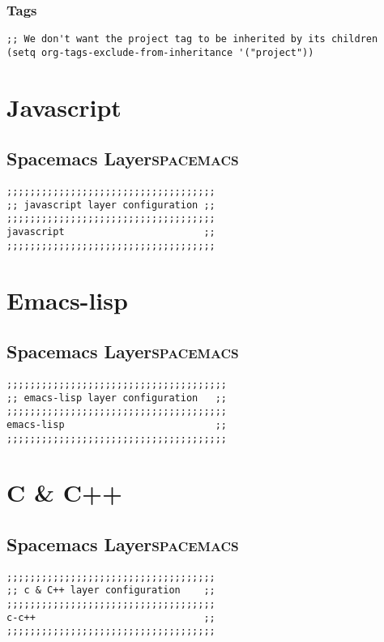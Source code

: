 \documentclass[11pt]{article}
\begin{document}
\subsubsection{Tags}
\label{sec:org92c714c}
\begin{verbatim}
;; We don't want the project tag to be inherited by its children
(setq org-tags-exclude-from-inheritance '("project"))
\end{verbatim}



\section{Javascript}
\label{sec:org60f302c}
\subsection{Spacemacs Layer\hfill{}\textsc{spacemacs}}
\label{sec:org8e4829a}
\begin{verbatim}
;;;;;;;;;;;;;;;;;;;;;;;;;;;;;;;;;;;;
;; javascript layer configuration ;;
;;;;;;;;;;;;;;;;;;;;;;;;;;;;;;;;;;;;
javascript                        ;;
;;;;;;;;;;;;;;;;;;;;;;;;;;;;;;;;;;;;
\end{verbatim}

\section{Emacs-lisp}
\label{sec:orgd91cd55}
\subsection{Spacemacs Layer\hfill{}\textsc{spacemacs}}
\label{sec:org3e1f2b0}
\begin{verbatim}
;;;;;;;;;;;;;;;;;;;;;;;;;;;;;;;;;;;;;;
;; emacs-lisp layer configuration   ;;
;;;;;;;;;;;;;;;;;;;;;;;;;;;;;;;;;;;;;;
emacs-lisp                          ;;
;;;;;;;;;;;;;;;;;;;;;;;;;;;;;;;;;;;;;;
\end{verbatim}

\section{C \& C++}
\label{sec:org8bfdc8e}
\subsection{Spacemacs Layer\hfill{}\textsc{spacemacs}}
\label{sec:org8832311}
\begin{verbatim}
;;;;;;;;;;;;;;;;;;;;;;;;;;;;;;;;;;;;
;; c & C++ layer configuration    ;;
;;;;;;;;;;;;;;;;;;;;;;;;;;;;;;;;;;;;
c-c++                             ;;
;;;;;;;;;;;;;;;;;;;;;;;;;;;;;;;;;;;;
\end{verbatim}
\end{document}
